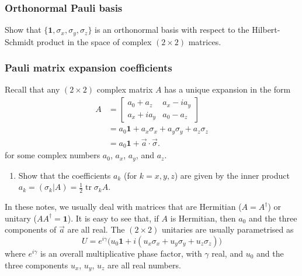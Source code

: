\documentclass[fleqn]{article}
\providecommand{\tightlist}{%
  \setlength{\itemsep}{0pt}\setlength{\parskip}{0pt}}
\begin{document}
\hypertarget{orthonormal-pauli-basis}{%
\subsubsection{Orthonormal Pauli basis}\label{orthonormal-pauli-basis}}

Show that \(\{\mathbf{1},\sigma_x,\sigma_y,\sigma_z\}\) is an orthonormal basis with respect to the Hilbert-Schmidt product in the space of complex \((2\times 2)\) matrices.

\hypertarget{pauli-matrix-expansion-coefficients}{%
\subsubsection{Pauli matrix expansion coefficients}\label{pauli-matrix-expansion-coefficients}}

Recall that any \((2\times 2)\) complex matrix \(A\) has a unique expansion in the form
\[
  \begin{aligned}
    A &=
    \begin{bmatrix}
      a_0 + a_z & a_x - i a_y
    \\a_x +i a_y &  a_0 - a_z
    \end{bmatrix}
  \\&= a_0\mathbf{1}+ a_x \sigma_x + a_y \sigma_y + a_z \sigma_z
  \\&= a_0\mathbf{1}+ \vec{a}\cdot\vec{\sigma}.
  \end{aligned}
\tag{$\star$}
\]
for some complex numbers \(a_0\), \(a_x\), \(a_y\), and \(a_z\).

\begin{enumerate}
\def\labelenumi{\arabic{enumi}.}
\tightlist
\item
  Show that the coefficients \(a_k\) (for \(k=x,y,z\)) are given by the inner product \(a_k = (\sigma_k|A) = \frac12\operatorname{tr}\sigma_k A\).
\end{enumerate}

In these notes, we usually deal with matrices that are Hermitian (\(A=A^\dagger\)) or unitary (\(AA^\dagger=\mathbf{1}\)).
It is easy to see that, if \(A\) is Hermitian, then \(a_0\) and the three components of \(\vec{a}\) are all real.
The \((2\times 2)\) unitaries are usually parametrised as
\[
  U = e^{i\gamma}\Big(u_0\mathbf{1}+ i(u_x\sigma_x + u_y\sigma_y + u_z\sigma_z)\Big)
\]
where \(e^{i\gamma}\) is an overall multiplicative phase factor, with \(\gamma\) real, and \(u_0\) and the three components \(u_x\), \(u_y\), \(u_z\) are all real numbers.
\end{document}
